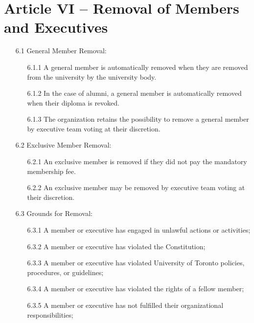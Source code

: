 \documentclass[12pt,a4paper]{article}
\begin{document}
\section*{Article VI – Removal of Members and Executives}

\begin{enumerate}
\item[6.1] General Member Removal:

\begin{enumerate}
\item[6.1.1] A general member is automatically removed when they are removed from the university by the university body.

\item[6.1.2] In the case of alumni, a general member is automatically removed when their diploma is revoked.

\item[6.1.3] The organization retains the possibility to remove a general member by executive team voting at their discretion.
\end{enumerate}

\item[6.2] Exclusive Member Removal:

\begin{enumerate}
\item[6.2.1] An exclusive member is removed if they did not pay the mandatory membership fee.

\item[6.2.2] An exclusive member may be removed by executive team voting at their discretion.
\end{enumerate}

\item[6.3] Grounds for Removal:

\begin{enumerate}
\item[6.3.1] A member or executive has engaged in unlawful actions or activities;

\item[6.3.2] A member or executive has violated the Constitution;

\item[6.3.3] A member or executive has violated University of Toronto policies, procedures, or guidelines;

\item[6.3.4] A member or executive has violated the rights of a fellow member;

\item[6.3.5] A member or executive has not fulfilled their organizational responsibilities;


\end{enumerate}
\end{enumerate}
\end{document}
